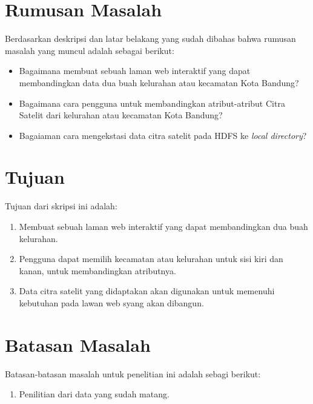 \section{Rumusan Masalah}
\label{sec:rumusan}
Berdasarkan deskripsi dan latar belakang yang sudah dibahas bahwa rumusan masalah yang muncul adalah sebagai berikut:

\begin{itemize}
	\item Bagaimana membuat sebuah laman web interaktif yang dapat membandingkan data dua buah kelurahan atau kecamatan Kota Bandung?
	\item Bagaimana cara pengguna untuk membandingkan atribut-atribut Citra Satelit dari kelurahan atau kecamatan Kota Bandung?
	\item Bagaiaman cara mengekstasi data citra satelit pada HDFS ke \textit{local directory}?	
\end{itemize}

\section{Tujuan}
\label{sec:tujuan}
Tujuan dari skripsi ini adalah:
\begin{enumerate}
	\item Membuat sebuah laman web interaktif yang dapat membandingkan dua buah kelurahan.
	\item Pengguna dapat memilih kecamatan atau kelurahan untuk sisi kiri dan kanan, untuk membandingkan atributnya.
	\item Data citra satelit yang didaptakan akan digunakan untuk memenuhi kebutuhan pada lawan web syang akan dibangun.
\end{enumerate}


\section{Batasan Masalah}
\label{sec:batasan}

Batasan-batasan masalah untuk penelitian ini adalah sebagi berikut:
\begin{enumerate}
	\item Penilitian dari data yang sudah matang.
\end{enumerate}

